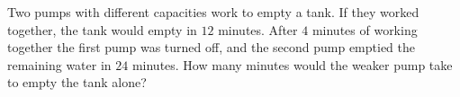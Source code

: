 Two pumps with different capacities work to empty a tank. If they worked together, the tank would empty in $12$ minutes. After $4$ minutes of working together the first pump was turned off, and the second pump emptied the remaining water in $24$ minutes. How many minutes would the weaker pump take to empty the tank alone?
